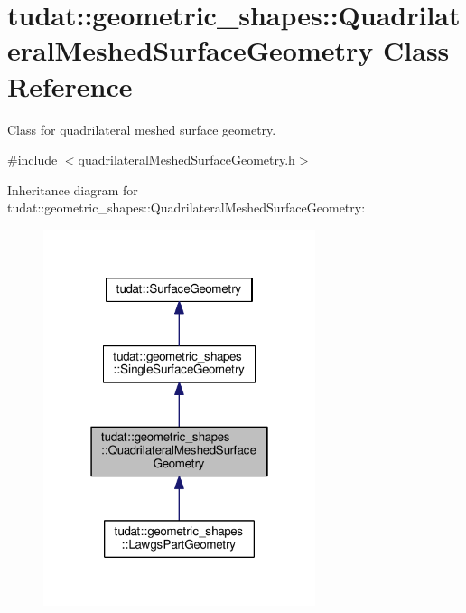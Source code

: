 \hypertarget{classtudat_1_1geometric__shapes_1_1QuadrilateralMeshedSurfaceGeometry}{}\section{tudat\+:\+:geometric\+\_\+shapes\+:\+:Quadrilateral\+Meshed\+Surface\+Geometry Class Reference}
\label{classtudat_1_1geometric__shapes_1_1QuadrilateralMeshedSurfaceGeometry}


Class for quadrilateral meshed surface geometry.  




{\ttfamily \#include $<$quadrilateral\+Meshed\+Surface\+Geometry.\+h$>$}



Inheritance diagram for tudat\+:\+:geometric\+\_\+shapes\+:\+:Quadrilateral\+Meshed\+Surface\+Geometry\+:
\nopagebreak
\begin{figure}[H]
\begin{center}
\leavevmode
\includegraphics[width=226pt]{classtudat_1_1geometric__shapes_1_1QuadrilateralMeshedSurfaceGeometry__inherit__graph}
\end{center}
\end{figure}


